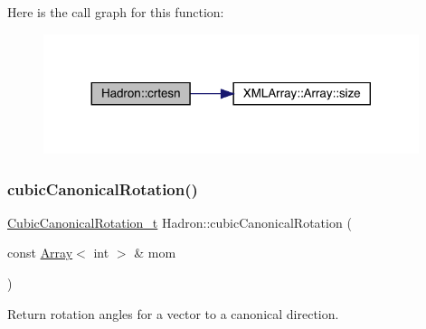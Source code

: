Here is the call graph for this function\+:
\nopagebreak
\begin{figure}[H]
\begin{center}
\leavevmode
\includegraphics[width=311pt]{d1/daf/namespaceHadron_a10fe1c3c465ac8dd8b6edab007aa6ab7_cgraph}
\end{center}
\end{figure}
\mbox{\label{namespaceHadron_ada689173e1553ad2f452af24028eae2f}} 
\subsubsection{\texorpdfstring{cubicCanonicalRotation()}{cubicCanonicalRotation()}}
{\footnotesize\ttfamily \mbox{\hyperlink{structHadron_1_1CubicCanonicalRotation__t}{Cubic\+Canonical\+Rotation\+\_\+t}} Hadron\+::cubic\+Canonical\+Rotation (\begin{DoxyParamCaption}\item[{const \mbox{\hyperlink{classXMLArray_1_1Array}{Array}}$<$ int $>$ \&}]{mom }\end{DoxyParamCaption})}



Return rotation angles for a vector to a canonical direction. 

